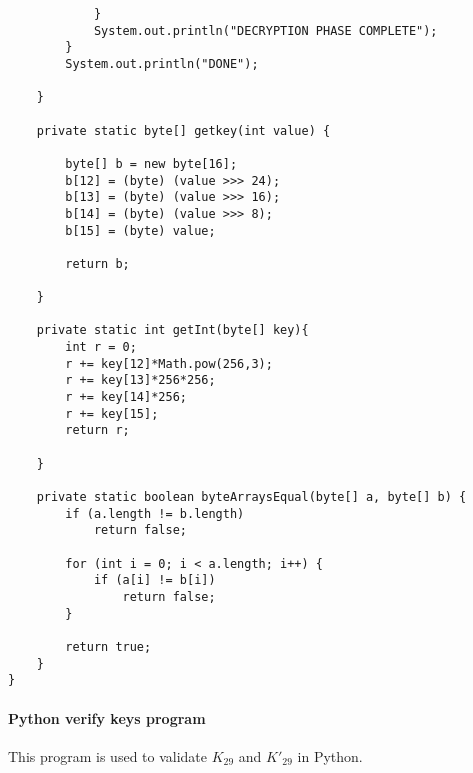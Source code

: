 \documentclass[11pt]{article}
\begin{document}
\begin{verbatim}
			}
			System.out.println("DECRYPTION PHASE COMPLETE");
		}
		System.out.println("DONE");
	
	}

	private static byte[] getkey(int value) {

		byte[] b = new byte[16];
		b[12] = (byte) (value >>> 24);
		b[13] = (byte) (value >>> 16);
		b[14] = (byte) (value >>> 8);
		b[15] = (byte) value;

		return b;

	}
	
	private static int getInt(byte[] key){
		int r = 0;
		r += key[12]*Math.pow(256,3);
		r += key[13]*256*256;
		r += key[14]*256;
		r += key[15];
		return r;
		
	}

	private static boolean byteArraysEqual(byte[] a, byte[] b) {
		if (a.length != b.length)
			return false;

		for (int i = 0; i < a.length; i++) {
			if (a[i] != b[i])
				return false;
		}

		return true;
	}
}

\end{verbatim}

\paragraph{Python verify keys program}
\begin{flushleft}
This program is used to validate $K_{29}$ and $K'_{29}$ in Python.
\end{flushleft}
\end{document}
